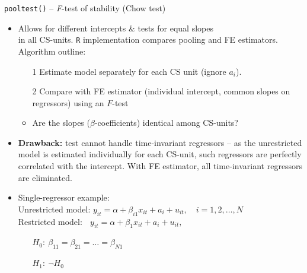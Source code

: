 \documentclass[usenames,dvipsnames]{beamer}
\begin{document}
\begin{frame}{\texttt{pooltest()} -- \textit{F}-test of stability (Chow test)}
\small 
\begin{itemize}
    
    \smallskip
    \item Allows for different intercepts \& tests for equal slopes \\in all CS-units. \texttt{R} implementation compares pooling and FE estimators. Algorithm outline:
    \begin{itemize}
        \item[1] Estimate model separately for each CS unit (ignore $a_i$).
        \item[2] Compare with FE estimator (individual intercept, common slopes on regressors) using an $F$-test 
        \item Are the slopes ($\beta$-coefficients) identical among CS-units?
    \end{itemize}
    \smallskip
    \item \textbf{Drawback:} test cannot handle time-invariant regressors -- as the unrestricted model is estimated individually for each CS-unit, such regressors are perfectly correlated with the intercept. With FE estimator, all time-invariant regressors are eliminated. 
    \medskip
    \item Single-regressor example:\\ \medskip Unrestricted model: $y_{it} = \alpha + \beta_{i1} x_{it} + a_i + u_{it}, \quad i=1,2,\dots,N$\\ \smallskip Restricted model: $\,~~y_{it} = \alpha + \beta_1 x_{it} + a_i + u_{it},$
\begin{itemize}
    \item[] $H_0:~\beta_{11}=\beta_{21}=\dots=\beta_{N1}$  
    \item[] $H_1:~\neg H_0$
\end{itemize}
\end{itemize}
\end{frame}
\end{document}
